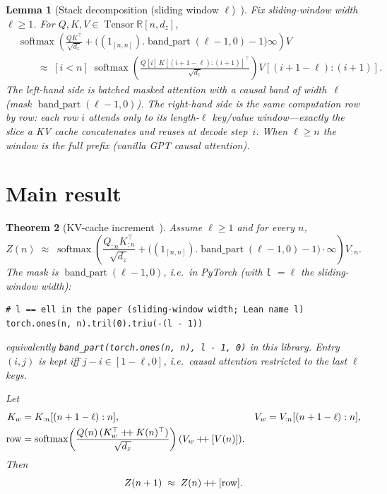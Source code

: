 \documentclass[11pt,a4paper]{article}
\newtheorem{theorem}{Theorem}[section]
\newtheorem{lemma}[theorem]{Lemma}
\newcommand{\Tensor}{\operatorname{Tensor}}
\newcommand{\bandpart}{\operatorname{band\_part}}
\newcommand{\rowop}{\operatorname{row}}
\newcommand{\concat}{\mathbin{+\mkern-4mu+}}
\newcommand{\XEq}{\approx}
\begin{document}
\begin{lemma}[Stack decomposition (sliding window $\ell$)~\cite{lemma_gpt}]
\label{lem:gpt}
Fix sliding-window width $\ell\ge 1$.
For $Q,K,V\in\Tensor\mathbb{R}[n,d_z]$,
\begin{align*}
&\operatorname{softmax}\!\left(
\frac{QK^{\top}}{\sqrt{d_z}}
+\bigl((1_{[n,n]}).\bandpart(\ell-1,0)-1\bigr)\infty
\right)V \\
&\qquad\XEq\;
[i<n]\;
\operatorname{softmax}\!\left(\frac{Q[i]\,K[(i+1-\ell):(i+1)]^{\top}}{\sqrt{d_z}}\right)
V[(i+1-\ell):(i+1)].
\end{align*}
The left-hand side is batched masked attention with a causal band of width~$\ell$ (mask $\bandpart(\ell-1,0)$).
The right-hand side is the same computation row by row: each row $i$ attends only to its length-$\ell$ key/value window---exactly the slice a KV cache concatenates and reuses at decode step~$i$.
When $\ell\ge n$ the window is the full prefix (vanilla GPT causal attention).
\end{lemma}

\section{Main result}
\label{sec:main}

\begin{theorem}[KV-cache increment~\cite{lemma_kv_cache_lean}]
\label{thm:kv-cache}
Assume $\ell\ge 1$ and for every $n$,
\begin{equation}
\label{eq:hyp}
Z(n)\;\XEq\;
\operatorname{softmax}\!\left(
\frac{Q_{:n}K_{:n}^{\top}}{\sqrt{d_z}}
+\bigl((1_{[n,n]}).\bandpart(\ell-1,0)-1\bigr)\cdot\infty
\right)
V_{:n}.
\end{equation}
The mask is $\bandpart(\ell-1,0)$, i.e.\ in PyTorch (with \texttt{l} $=\ell$ the sliding-window width):
\begin{verbatim}
# l == ell in the paper (sliding-window width; Lean name l)
torch.ones(n, n).tril(0).triu(-(l - 1))
\end{verbatim}
\noindent
equivalently \texttt{band\_part(torch.ones(n, n), l - 1, 0)} in this library.
Entry $(i,j)$ is kept iff $j-i\in[1-\ell,0]$, i.e.\ causal attention restricted to the last $\ell$ keys.

Let
\begin{align*}
K_w&=K_{:n}[(n+1-\ell):n],&
V_w&=V_{:n}[(n+1-\ell):n],\\
\rowop&=
\operatorname{softmax}\!\left(\frac{Q(n)\,(K_w^{\top}\concat K(n)^{\top})}{\sqrt{d_z}}\right)
(V_w\concat[V(n)]).
\end{align*}
Then
\begin{equation}
\label{eq:conc}
Z(n+1)\;\XEq\; Z(n)\concat[\rowop].
\end{equation}
\end{theorem}
\end{document}
